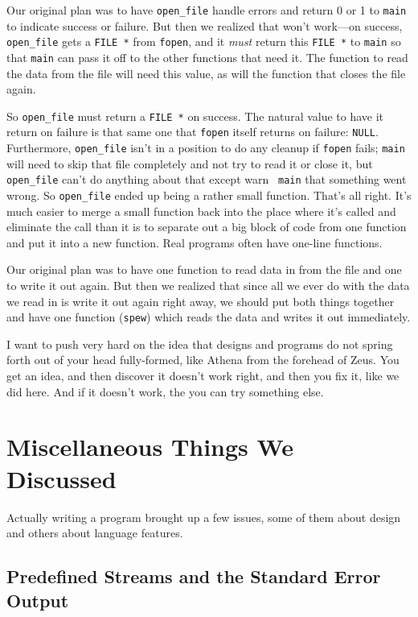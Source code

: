 Our original plan was to have {\tt open\_file} handle errors and return
0 or 1 to {\tt main} to indicate success or failure.  But then we
realized that won't work---on success, {\tt open\_file} gets a {\tt FILE
*} from {\tt fopen}, and it {\em must}\/ return this {\tt FILE *} to
{\tt main} so that {\tt main} can pass it off to the other functions
that need it.  The function to read the data from the file will need
this value, as will the function that closes the file again.

So {\tt open\_file} must return a {\tt FILE *} on success.  The natural
value to have it return on failure is that same one that {\tt fopen}
itself returns on failure: {\tt NULL}.  Furthermore, {\tt open\_file}
isn't in a position to do any cleanup if {\tt fopen} fails; {\tt main}
will need to skip that file completely and not try to read it or close
it, but {\tt open\_file} can't do anything about that except warn {\tt
main} that something went wrong.  So {\tt open\_file} ended up being a
rather small function.  That's all right.  It's much easier to merge a
small function back into the place where it's called and eliminate the
call than it is to separate out a big block of code from one function
and put it into a new function.  Real programs often have one-line
functions. 

Our original plan was to have one function to read data in from the file
and one to write it out again.  But then we realized that since all we
ever do with the data we read in is write it out again right away, we
should put both things together and have one function ({\tt spew}) which
reads the data and writes it out immediately.  

I want to push very hard on the idea that designs and programs do not
spring forth out of your head fully-formed, like Athena from the
forehead of Zeus.  You get an idea, and then discover it doesn't work
right, and then you fix it, like we did here.  And if it doesn't work,
the you can try something else. 

\section{Miscellaneous Things We Discussed}

Actually writing a program brought up a few issues, some of them about
design and others about language features.

\subsection{Predefined Streams and the Standard Error Output}

